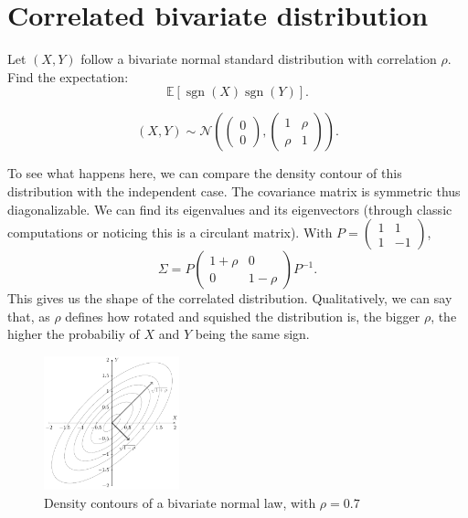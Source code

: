 \section{Correlated bivariate distribution}

\begin{tcolorbox}[width=\linewidth, sharp corners=all, colback=white!95!black]
Let $(X,Y)$ follow a bivariate normal standard distribution with correlation $\rho$. Find the expectation: $$\mathbb{E}[\operatorname{sgn}(X)\operatorname{sgn}(Y)].$$
\end{tcolorbox}

$$(X,Y) \sim \mathcal{N}\left(\begin{pmatrix}0\\0\end{pmatrix}, \begin{pmatrix}
1 & \rho\\ \rho & 1
\end{pmatrix}\right).$$

To see what happens here, we can compare the density contour of this distribution with the independent case. The covariance matrix is symmetric thus diagonalizable. We can find its eigenvalues and its eigenvectors (through classic computations or noticing this is a circulant matrix). With $P = \begin{pmatrix}
1 & 1\\ 1 & -1
\end{pmatrix}$,
$$\Sigma = P\begin{pmatrix}
1+\rho & 0\\ 0 & 1-\rho
\end{pmatrix}P^{-1}.$$
This gives us the shape of the correlated distribution. Qualitatively, we can say that, as $\rho$ defines how rotated and squished the distribution is, the bigger $\rho$, the higher the probabiliy of $X$ and $Y$ being the same sign.

\begin{figure}[H]
\includegraphics[width=0.35\textwidth]{images/tikz/bivariate_contour.pdf}
\centering
\caption{Density contours of a bivariate normal law, with $\rho=0.7$}
\label{fig:bivariate_contour}
\end{figure}


